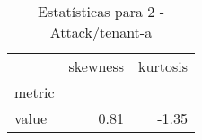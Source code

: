 \begin{table}[htbp]
\caption{Estatísticas para 2 - Attack/tenant-a}
\label{tab:2_-_attack_tenant-a_skewkurt}
\begin{tabular}{lrr}
\toprule
 & skewness & kurtosis \\
metric &  &  \\
\midrule
value & 0.81 & -1.35 \\
\bottomrule
\end{tabular}
\end{table}
